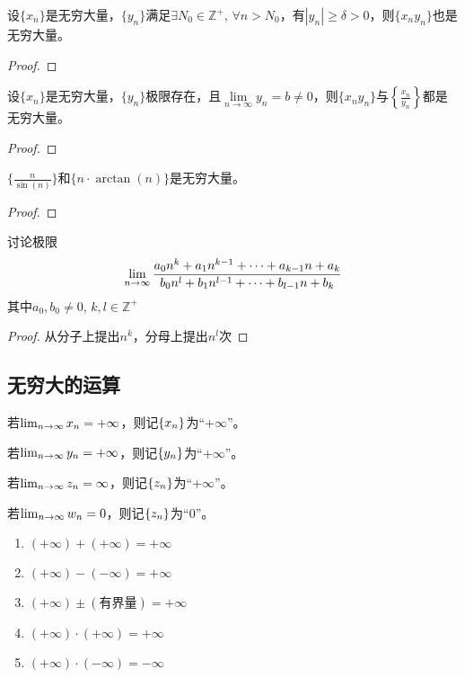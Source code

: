 \begin{lemma}
    设$\{ x_n \}$是无穷大量，$\{ y_n \}$满足$\exists N_0 \in \mathbb{Z}^+$, $\forall n > N_0$，有$| y_n | \ge \delta > 0$，则$\{ x_n y_n\}$也是无穷大量。
\end{lemma}
\begin{proof}
\end{proof}

\begin{lemma}
    设$\{ x_n \}$是无穷大量，$\{ y_n \}$极限存在，且$\lim\limits_{n \to \infty}y_n = b \ne 0$，则$\{ x_n y_n\}$与$\left\{ \frac{x_n}{y_n} \right\}$都是无穷大量。
\end{lemma}
\begin{proof}
\end{proof}

\begin{proposition}
    $\{ \frac{n}{\sin(n)}\}$和$\{ n \cdot \arctan(n)\}$是无穷大量。
\end{proposition}
\begin{proof}
\end{proof}

\begin{proposition}
    讨论极限
    \[ \lim_{n \to \infty} \frac{a_0 n^k + a_1 n^{k - 1} + \cdots + a_{k - 1} n + a_k}{b_0 n^l + b_1 n^{l - 1} + \cdots + b_{l - 1} n + b_k}\]
    其中$a_0, b_0 \ne 0$, $k, l \in \mathbb{Z}^+$
\end{proposition}
\begin{proof}
    从分子上提出$n^k$，分母上提出$n^l$次
\end{proof}
\subsection{无穷大的运算}
若$\lim_{n \to \infty } x_n = +\infty$，则记$\left\{ x_n\right\}$为``+$\infty$''。

若$\lim_{n \to \infty } y_n = +\infty$，则记$\left\{ y_n\right\}$为``+$\infty$''。

若$\lim_{n \to \infty } z_n = \infty$，则记$\left\{ z_n\right\}$为``+$\infty$''。

若$\lim_{n \to \infty } w_n = 0$，则记$\left\{ z_n\right\}$为``0''。
\begin{theorem}
    \begin{enumerate}
        \item $(+\infty) + (+\infty) = +\infty$
        \item $(+\infty) - (-\infty) = +\infty$
        \item $(+\infty) \pm (\text{有界量}) = +\infty$
        \item $(+\infty) \cdot (+\infty) = +\infty$
        \item $(+\infty) \cdot (-\infty) = -\infty$
    \end{enumerate}
\end{theorem}

